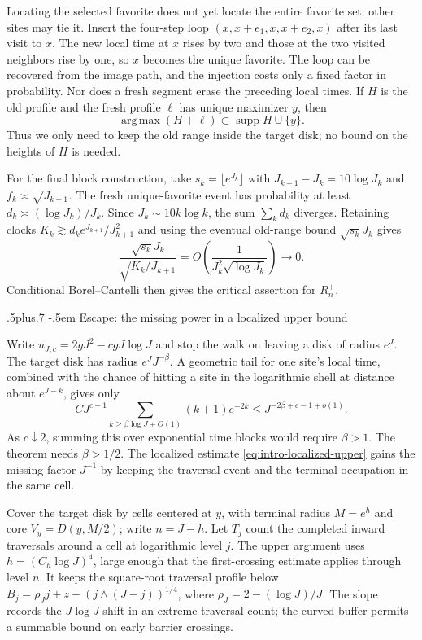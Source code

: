 \documentclass[12pt,reqno]{amsart}
\makeatletter
\def\subsection{\@startsection{subsection}{2}{0pt}%
  {.5\linespacing plus.7\linespacing}
  {-.5em}
  {\normalfont\scshape}}
\theoremstyle{plain}
\theoremstyle{definition}
\theoremstyle{remark}
\numberwithin{equation}{section}
\makeatother
\begin{document}
Locating the selected favorite does not yet locate the entire favorite set:
other sites may tie it. Insert the four-step loop
$(x,x+e_1,x,x+e_2,x)$ after its last visit to $x$. The new local time at
$x$ rises by two and those at the two visited neighbors rise by one, so $x$
becomes the unique favorite. The loop can be recovered from the image path,
and the injection costs only a fixed factor in probability. Nor does a
fresh segment erase the preceding local times. If $H$ is the old profile
and the fresh profile $\ell$ has unique maximizer $y$, then
\[
 \operatorname*{arg\,max}(H+\ell)
 \subset\operatorname{supp}H\cup\{y\}.
\]
Thus we only need to keep the old range inside the target disk; no bound on
the heights of $H$ is needed.

For the final block construction, take $s_k=\lfloor e^{J_k}\rfloor$ with
$J_{k+1}-J_k=10\log J_k$ and $f_k\asymp\sqrt{J_{k+1}}$.
The fresh unique-favorite event has probability at least
$d_k\asymp(\log J_k)/J_k$. Since $J_k\sim10k\log k$, the sum
$\sum_kd_k$ diverges. Retaining clocks
$K_k\gtrsim d_k e^{J_{k+1}}/J_{k+1}^2$ and using the eventual old-range
bound $\sqrt{s_k}J_k$ gives
\[
 \frac{\sqrt{s_k}J_k}{\sqrt{K_k/J_{k+1}}}
 =O\left(\frac1{J_k^2\sqrt{\log J_k}}\right)\longrightarrow0.
\]
Conditional Borel--Cantelli then gives the
critical assertion for $R_n^+$.

\subsection{Escape: the missing power in a localized upper bound}

Write $u_{J,c}=2gJ^2-cgJ\log J$ and stop the walk on leaving a disk of
radius $e^J$. The target disk has radius $e^JJ^{-\beta}$. A geometric
tail for one site's local time, combined with the chance of hitting a site
in the logarithmic shell at distance about $e^{J-k}$, gives only
\begin{equation}\label{eq:ideas-naive-upper}
 C J^{c-1}\sum_{k\ge\beta\log J+O(1)}(k+1)e^{-2k}
 \le J^{-2\beta+c-1+o(1)}.
\end{equation}
As $c\downarrow2$, summing this over exponential time blocks would require
$\beta>1$. The theorem needs $\beta>1/2$. The localized estimate
\eqref{eq:intro-localized-upper} gains the missing factor $J^{-1}$ by
keeping the traversal event and the terminal occupation in the same cell.

Cover the target disk by cells centered at $y$, with terminal radius
$M=e^h$ and core $V_y=D(y,M/2)$; write $n=J-h$. Let $T_j$ count the
completed inward traversals around a cell at logarithmic level $j$.
The upper argument uses $h=(C_h\log J)^4$, large enough that the
first-crossing estimate applies through level $n$. It keeps the
square-root traversal profile below
$B_j=\rho_Jj+z+(j\wedge(J-j))^{1/4}$, where
$\rho_J=2-(\log J)/J$. The slope records the $J\log J$ shift in an
extreme traversal count; the curved buffer permits a summable bound on
early barrier crossings.
\end{document}
